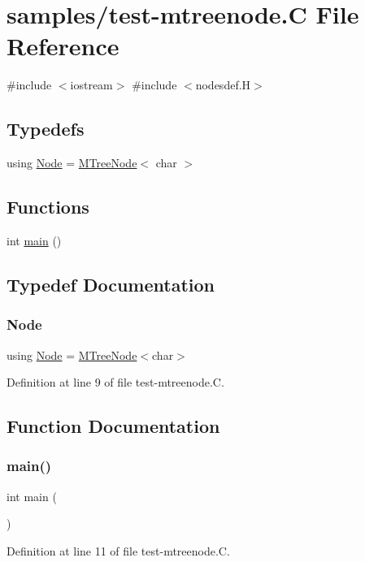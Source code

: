 \hypertarget{test-mtreenode_8_c}{}\section{samples/test-\/mtreenode.C File Reference}
\label{test-mtreenode_8_c}
{\ttfamily \#include $<$iostream$>$}\newline
{\ttfamily \#include $<$nodesdef.\+H$>$}\newline
\subsection*{Typedefs}
\begin{DoxyCompactItemize}
\item 
using \hyperlink{test-mtreenode_8_c_a17a24b0725f59987143c5faf63c4dc6f}{Node} = \hyperlink{class_designar_1_1_m_tree_node}{M\+Tree\+Node}$<$ char $>$
\end{DoxyCompactItemize}
\subsection*{Functions}
\begin{DoxyCompactItemize}
\item 
int \hyperlink{test-mtreenode_8_c_ae66f6b31b5ad750f1fe042a706a4e3d4}{main} ()
\end{DoxyCompactItemize}


\subsection{Typedef Documentation}
\mbox{\label{test-mtreenode_8_c_a17a24b0725f59987143c5faf63c4dc6f}} 
\subsubsection{\texorpdfstring{Node}{Node}}
{\footnotesize\ttfamily using \hyperlink{namespace_designar_a5af326c65aa2bd26b26c410f2030d09e}{Node} =  \hyperlink{class_designar_1_1_m_tree_node}{M\+Tree\+Node}$<$char$>$}



Definition at line 9 of file test-\/mtreenode.\+C.



\subsection{Function Documentation}
\mbox{\label{test-mtreenode_8_c_ae66f6b31b5ad750f1fe042a706a4e3d4}} 
\subsubsection{\texorpdfstring{main()}{main()}}
{\footnotesize\ttfamily int main (\begin{DoxyParamCaption}{ }\end{DoxyParamCaption})}



Definition at line 11 of file test-\/mtreenode.\+C.

